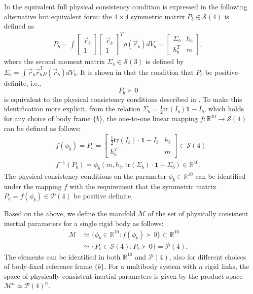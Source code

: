 \documentclass[letterpaper, 10 pt, conference]{ieeeconf}  %
\begin{document}
In \cite{Wensing_RAL} the equivalent full physical consistency condition is expressed in the following
alternative but equivalent form: the $4 \times 4$ symmetric matrix $P_{b} \in \mathcal{S}(4)$ 
is defined as 
\begin{eqnarray}
P_{b} = \int \left[\begin{array}{c} \vec{r}_{b} \\ 1 \end{array}\right]
  \left[\begin{array}{c} \vec{r}_{b} \\ 1 \end{array}\right]^{T} \rho(\vec{r}_b) dV_{b} 
= \left[\begin{array}{cc} \Sigma_{b} & h_{b} \\ h_{b}^{T} & m \end{array}\right],
\label{44psd}
\end{eqnarray}
where the second moment matrix $\Sigma_{b}\in \mathcal{S}(3)$ is defined by
$\Sigma_{b} = \int \vec{r}_{b}\vec{r}_{b}^{T} \rho(\vec{r}_{b})dV_{b}$.  It is shown
in \cite{Wensing_RAL} that the condition that $P_b$ be positive-definite, i.e.,
\begin{equation}
P_b \succ 0
\label{full_cond_44psd}
\end{equation}
is equivalent to the physical consistency conditions described in \cite{Traversaro_IROS}.
To make this identification more explicit, from the relation $\Sigma_{b}
= \frac{1}{2}\mathrm{tr}(I_{b})\mathbf{1} - I_{b}$, which holds for any choice of
body frame $\{b\}$, the one-to-one linear mapping $f : \mathbb{R}^{10}
\rightarrow \mathcal{S}(4)$ can be defined as follows:
\begin{align*}
&f(\phi_{b}) = P_{b} = \left[\begin{array}{cc} \frac{1}{2}\mathrm{tr}(I_{b})
\cdot\mathbf{1} - I_{b} & h_{b} \\ h_{b}^{T} & m\end{array}\right] \in \mathcal{S}(4)\\
&f^{-1}(P_{b}) = \phi_{b}(m, h_{b}, \mathrm{tr}(\Sigma_{b})\cdot\mathbf{1}
- \Sigma_{b}) \in \mathbb{R}^{10}.
\end{align*}
The physical consistency conditions on the  parameter $\phi_{b} \in \mathbb{R}^{10}$
can be identified under the mapping $f$ with the requirement that the symmetric matrix
$P_{b} = f(\phi_b) \in \mathcal{P}(4)$ be positive definite.

Based on the above, we define the manifold $\mathcal{M}$ of the set of physically consistent
inertial parameters for a single rigid body as follows:
\begin{align*}
\mathcal{M} &\simeq \{ \phi_{b} \in \mathbb{R}^{10} : f(\phi_{b}) \succ 0\}
\subset\mathbb{R}^{10}\nonumber\\
& \simeq \{ P_{b} \in \mathcal{S}(4) : P_{b} \succ 0\} = \mathcal{P}(4).
\end{align*}
The elements can be identified in both $\mathbb{R}^{10}$ and $\mathcal{P}(4)$, also
for different choices of body-fixed reference frame $\{b\}$. For a multibody system
with $n$ rigid links, the space of physically consistent inertial parameters is
given by the product space $\mathcal{M}^{n} \simeq \mathcal{P}(4)^{n}$.
\end{document}
